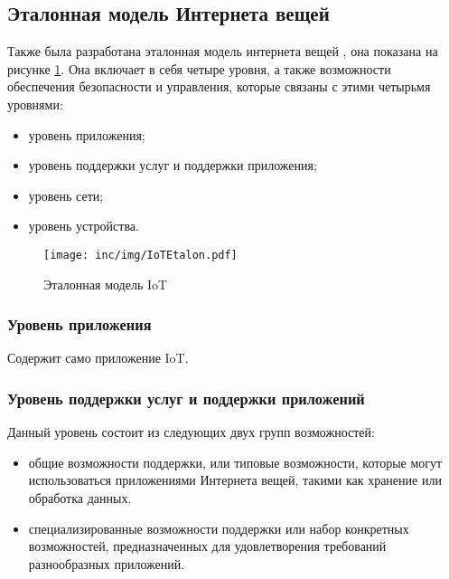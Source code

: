 \subsection{Эталонная модель Интернета вещей}

Также была разработана эталонная модель интернета вещей \cite{itutiot2012}, она показана на рисунке \ref{fig:iotetalon}.
Она включает в себя четыре уровня, а также возможности обеспечения безопасности и управления, которые связаны с этими четырьмя уровнями:

\begin{itemize}
	\item уровень приложения;
	\item уровень поддержки услуг и поддержки приложения;
	\item уровень сети;
	\item уровень устройства.
\end{itemize}

\begin{figure}
  \centering
  \texttt{[image: inc/img/IoTEtalon.pdf]}
	\caption{Эталонная модель IoT}
  \label{fig:iotetalon}
\end{figure}


\subsubsection{Уровень приложения}

Содержит само приложение IoT.


\subsubsection{Уровень поддержки услуг и поддержки приложений}

Данный уровень состоит из следующих двух групп возможностей:

\begin{itemize}
	\item общие возможности поддержки, или типовые возможности, которые могут использоваться приложениями Интернета вещей, такими как хранение или обработка данных.
	\item специализированные возможности поддержки или набор конкретных возможностей, предназначенных для удовлетворения требований разнообразных приложений.
\end{itemize}



